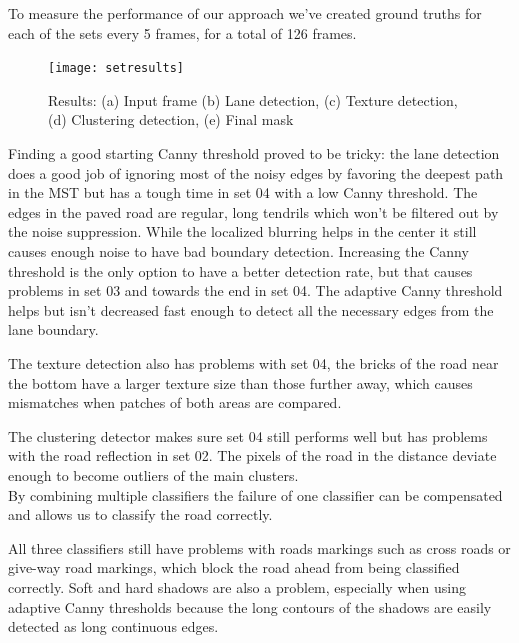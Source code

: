 \documentclass[oneside,english]{llncs}
\begin{document}
To measure the performance of our approach we've created ground truths for each of the sets every 5 frames, for a total of 126 frames.

\begin{figure}
    \centering
    \texttt{[image: setresults]}
    \caption{Results: (a) Input frame (b) Lane detection, (c) Texture detection, (d) Clustering detection, (e) Final mask}
    \label{fig:Results}
\end{figure}

Finding a good starting Canny threshold proved to be tricky: the lane detection does a good job of ignoring most of the noisy edges by favoring the deepest path in the MST but has a tough time in set 04 with a low Canny threshold. The edges in the paved road are regular, long tendrils which won't be filtered out by the noise suppression. While the localized blurring helps in the center it still causes enough noise to have bad boundary detection. Increasing the Canny threshold is the only option to have a better detection rate, but that causes problems in set 03 and towards the end in set 04. The adaptive Canny threshold helps but isn't decreased fast enough to detect all the necessary edges from the lane boundary.

The texture detection also has problems with set 04, the bricks of the road near the bottom have a larger texture size than those further away, which causes mismatches when patches of both areas are compared.

The clustering detector makes sure set 04 still performs well but has problems with the road reflection in set 02. The pixels of the road in the distance deviate enough to become outliers of the main clusters.\\
By combining multiple classifiers the failure of one classifier can be compensated and allows us to classify the road correctly.

All three classifiers still have problems with roads markings such as cross roads or give-way road markings, which block the road ahead from being classified correctly. Soft and hard shadows are also a problem, especially when using adaptive Canny thresholds because the long contours of the shadows are easily detected as long continuous edges.
\end{document}
